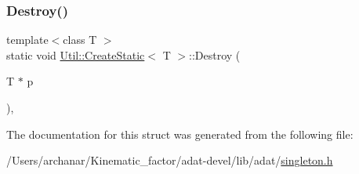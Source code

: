 \subsubsection{\texorpdfstring{Destroy()}{Destroy()}\hspace{0.1cm}{\footnotesize\ttfamily [3/3]}}
{\footnotesize\ttfamily template$<$class T $>$ \\
static void \mbox{\hyperlink{structUtil_1_1CreateStatic}{Util\+::\+Create\+Static}}$<$ T $>$\+::Destroy (\begin{DoxyParamCaption}\item[{T $\ast$}]{p }\end{DoxyParamCaption})\hspace{0.3cm}{\ttfamily [inline]}, {\ttfamily [static]}}



The documentation for this struct was generated from the following file\+:\begin{DoxyCompactItemize}
\item 
/\+Users/archanar/\+Kinematic\+\_\+factor/adat-\/devel/lib/adat/\mbox{\hyperlink{adat-devel_2lib_2adat_2singleton_8h}{singleton.\+h}}\end{DoxyCompactItemize}
